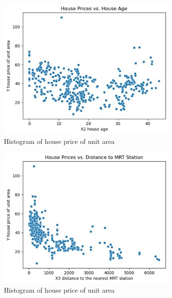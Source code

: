 \vspace{-.75cm}
\begin{figure}[h!]
    \centering
    \includegraphics[width=0.8\textwidth]{scatterplot.jpg}
    \caption{Histogram of house price of unit area}
     \label{fig:histogram}
\end{figure}
\newpage
\begin{figure}[h!]
    \centering
    \includegraphics[width=0.8\textwidth]{scatterplot1.jpg}
    \caption{Histogram of house price of unit area}
     \label{fig:histogram}
\end{figure}
\vspace{-.75cm}
